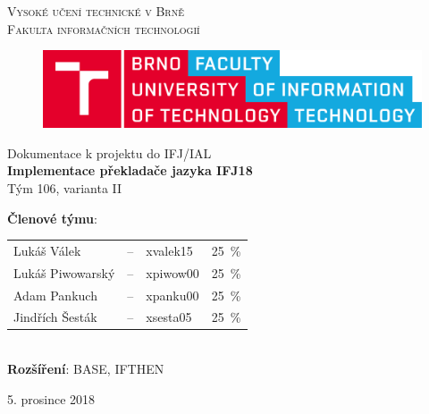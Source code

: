 \documentclass[11pt, a4paper]{article}
\begin{document}
\begin{titlepage}
\begin{center}
  
{\Huge \textsc{Vysoké učení technické v Brně \\
\vspace{0.5em}
}}
{\huge   \textsc{Fakulta informačních technologií}
}

\vspace{1.5em}
\begin{figure}[ht]
\begin{center}
\includegraphics[scale=0.13]{fit.png}
\end{center}
\end{figure}




\begin{LARGE}
Dokumentace k projektu do IFJ/IAL \\
\vspace{0.3em}
{\Huge \textbf{Implementace překladače jazyka IFJ18}} \\
\vspace{0.3em}
{\huge Tým 106, varianta II}  \\
\end{LARGE}



\end{center}

{\Large\begin{flushleft}
      \textbf{Členové týmu}: \vspace{-0.8em}
    \end{flushleft}

    \begin{tabular}{lclc}
Lukáš Válek      & -- & xvalek15   &  25 \,\% \\
Lukáš Piwowarský & -- & xpiwow00   &  25 \,\% \\
Adam Pankuch     & -- & xpanku00  &  25 \,\% \\
Jindřích Šesták  & -- & xsesta05  &  25 \,\%
    \end{tabular}} \\\vspace{0.3em}
    {\Large \textbf{Rozšíření}: BASE, IFTHEN} \\\vspace{0.3em}
    \begin{flushright}
      {\Large 5. prosince 2018}
    \end{flushright}
\end{titlepage}
\end{document}
